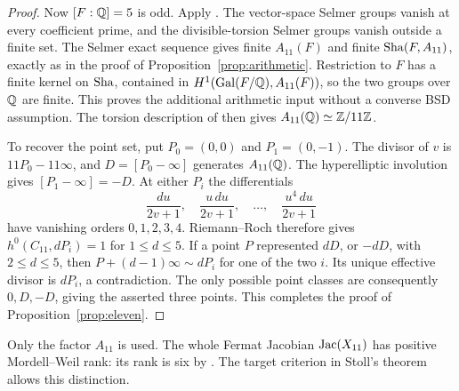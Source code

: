 \begin{proof}
Now $[F:\mathbb Q]=5$ is odd. Apply
\citet[Theorems B and B$'$, alternative (a), p.~593]{Nekovar2012}.
The vector-space Selmer groups vanish at every coefficient prime,
and the divisible-torsion Selmer groups vanish outside a finite set.
The Selmer exact sequence gives finite $A_{11}(F)$ and finite
$\operatorname{Sha}(F,A_{11})$, exactly as in the proof of
Proposition~\ref{prop:arithmetic}. Restriction to $F$ has a finite
kernel on $\operatorname{Sha}$, contained in
$H^1(\operatorname{Gal}(F/\mathbb Q),A_{11}(F))$, so the two groups over $\mathbb Q$ are finite.
This proves the additional arithmetic input without a converse BSD
assumption. The torsion description of
\citet[Theorem 1.1]{GrossRohrlich1978} then gives
$A_{11}(\mathbb Q)\simeq\mathbb Z/11\mathbb Z$.

To recover the point set, put $P_0=(0,0)$ and $P_1=(0,-1)$.
The divisor of $v$ is $11P_0-11\infty$, and
$D=[P_0-\infty]$ generates $A_{11}(\mathbb Q)$.
The hyperelliptic involution gives $[P_1-\infty]=-D$.
At either $P_i$ the differentials
\[
\frac{du}{2v+1},\quad\frac{u\,du}{2v+1},\quad\ldots,
\quad\frac{u^4\,du}{2v+1}
\]
have vanishing orders $0,1,2,3,4$. Riemann--Roch therefore gives
$h^0(C_{11},dP_i)=1$ for $1\leq d\leq5$.
If a point $P$ represented $dD$, or $-dD$, with $2\leq d\leq5$,
then $P+(d-1)\infty\sim dP_i$ for one of the two $i$.
Its unique effective divisor is $dP_i$, a contradiction.
The only possible point classes are consequently $0,D,-D$, giving
the asserted three points. This completes the proof of
Proposition~\ref{prop:eleven}.
\end{proof}

\begin{remark}\label{rem:eleven-factor-only}
Only the factor $A_{11}$ is used. The whole Fermat Jacobian
$\operatorname{Jac}(X_{11})$ has positive Mordell--Weil rank: its rank is six by
\citet[Introduction and \S4]{GrossRohrlich1978}.
The target criterion in Stoll's theorem allows this distinction.
\end{remark}
